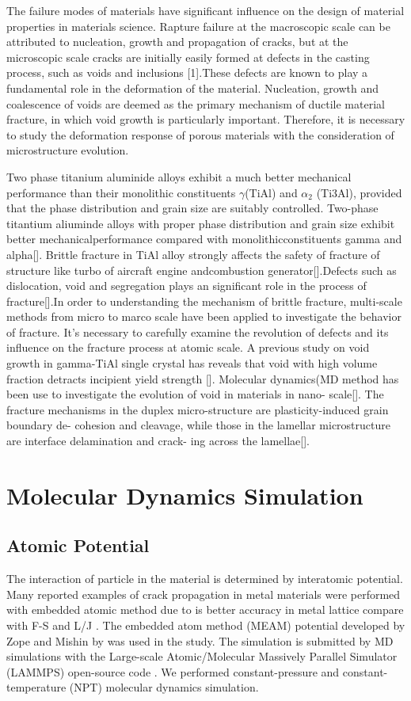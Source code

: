 \documentclass[times]{elsarticle}
\begin{document}
The failure modes of materials have significant influence on the design of material properties in materials science. Rapture failure at the macroscopic scale can be attributed to nucleation, growth and propagation of cracks, but at the microscopic scale cracks are initially easily formed at defects in the casting process, such as voids and inclusions [1].These defects are known to play a fundamental role in the deformation of the material. Nucleation, growth and coalescence of voids are deemed as the primary mechanism of ductile material fracture, in which void growth is particularly important. Therefore, it is necessary to study the deformation response of porous materials with the consideration of microstructure evolution.


Two phase titanium aluminide alloys exhibit a much better mechanical performance than their monolithic constituents $\gamma$(TiAl) and $\alpha_2$ (Ti3Al), provided that the phase distribution and grain size are suitably controlled. Two-phase titantium aliuminde alloys with proper phase distribution and grain size exhibit better mechanicalperformance compared with monolithicconstituents gamma and alpha[].
Brittle fracture in TiAl alloy strongly affects the safety of fracture of structure like turbo of aircraft engine andcombustion generator[].Defects such as dislocation, void and segregation plays an significant role in the process of fracture[].In order to understanding the mechanism of brittle fracture, multi-scale methods from micro to marco scale have been applied to investigate the behavior of fracture. It's necessary to carefully examine the revolution of defects and its influence on the fracture process at atomic scale.
A previous study on void growth in gamma-TiAl single crystal has reveals that void with high volume fraction detracts incipient yield strength [].
Molecular dynamics(MD method has been use to investigate the evolution of void in materials in nano-
scale[].
The fracture mechanisms in the duplex micro-structure are plasticity-induced grain boundary de- cohesion
and cleavage, while those in the lamellar microstructure are interface delamination and crack- ing across the
lamellae[].

\section{Molecular Dynamics Simulation }

\subsection{Atomic Potential}
The interaction of particle in the material is determined by interatomic potential. Many reported examples of crack propagation in metal materials were performed with embedded atomic method due to is better accuracy in metal lattice compare with F-S and L/J \cite{}. The embedded atom method (MEAM) potential developed by Zope and Mishin by \cite{} was used in the study. The simulation is submitted by MD simulations with the Large-scale Atomic/Molecular Massively Parallel Simulator (LAMMPS) open-source code \cite{}. We performed constant-pressure and constant-temperature (NPT) molecular dynamics simulation.
\end{document}
